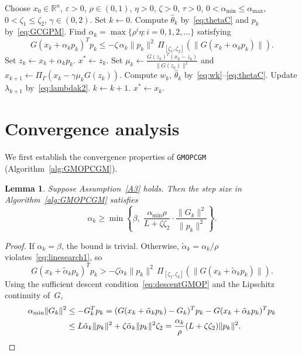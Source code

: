 \documentclass{article}
\theoremstyle{plain}
\newtheorem{lemma}{Lemma}
\theoremstyle{definition}
\theoremstyle{remark}
\newcommand{\R}{\mathbb{R}}
\newcommand{\norm}[1]{\|#1\|}
\newcommand{\PG}{\Pi_{\Gamma}}
\newcommand{\PI}[1]{\Pi_{#1}}
\newcommand{\algoname}[1]{{\small\texttt{#1}}}
\newcommand{\GMOPCGM}{\algoname{GMOPCGM}}
\newcommand{\GCGPM}{\algoname{GCGPM}}
\newcommand{\thetaC}{\hat{\theta}_k}                       %
\begin{document}
\begin{algorithm}[ht]
\caption{Generalized Conjugate Gradient Projection Method (\GCGPM)}
\label{alg:GCGPM}
\begin{algorithmic}[1]
  \State Choose $x_0 \in \R^n$, $\varepsilon > 0$, $\rho \in (0,1)$, $\eta > 0$, $\zeta > 0$, $\tau > 0$,
  \Statex \hspace{1.5em} $0 < \alpha_{\min} \leq \alpha_{\max}$, $0 < \zeta_1 \leq \zeta_2$, $\gamma \in (0,2)$. Set $k \gets 0$.
  \While{$\norm{G_k} > \varepsilon$}
    \State Compute $\thetaC$ by~\eqref{eq:thetaC} and $p_k$ by~\eqref{eq:GCGPM}.
    \State Find $\alpha_k = \max\{\rho^i \eta : i = 0,1,2,\ldots\}$ satisfying
    \begin{equation}\label{eq:linesearch2}
      G(x_k + \alpha_k p_k)^T p_k \leq -\zeta\,\alpha_k\norm{p_k}^2\,\PI{[\zeta_1,\zeta_2]}(\norm{G(x_k + \alpha_k p_k)}).
    \end{equation}
    \State Set $z_k \gets x_k + \alpha_k p_k$.
    \If{$z_k \in \Gamma$ and $\norm{G(z_k)} \leq \varepsilon$}
      \State \Return $x^* \gets z_k$.
    \EndIf
    \State Set $\mu_k \gets \frac{G(z_k)^T(x_k - z_k)}{\norm{G(z_k)}^2}$ and $x_{k+1} \gets \PG(x_k - \gamma\mu_k G(z_k))$.
    \State Compute $w_k$, $\thetaC$ by~\eqref{eq:wk}--\eqref{eq:thetaC}.
    \State Update $\lambda_{k+1}$ by~\eqref{eq:lambdak2}.
    \State $k \gets k+1$.
  \EndWhile
  \State \Return $x^* \gets x_k$.
\end{algorithmic}
\end{algorithm}

\section{Convergence analysis}\label{sec:convergence}

We first establish the convergence properties of \GMOPCGM{} (Algorithm~\ref{alg:GMOPCGM}).

\begin{lemma}\label{lem:stepsizeGMOP}
Suppose Assumption~\ref{A3} holds. Then the step size in Algorithm~\ref{alg:GMOPCGM} satisfies
\[
  \alpha_k \geq \min\!\left\{\beta,\; \frac{\alpha_{\min}\rho}{L + \zeta\zeta_2}\cdot\frac{\norm{G_k}^2}{\norm{p_k}^2}\right\}.
\]
\end{lemma}
\begin{proof}
If $\alpha_k = \beta$, the bound is trivial. Otherwise, $\tilde{\alpha}_k = \alpha_k/\rho$ violates~\eqref{eq:linesearch1}, so
\[
  G(x_k + \tilde{\alpha}_k p_k)^T p_k > -\zeta\tilde{\alpha}_k\norm{p_k}^2\,\PI{[\zeta_1,\zeta_2]}(\norm{G(x_k + \tilde{\alpha}_k p_k)}).
\]
Using the sufficient descent condition~\eqref{eq:descentGMOP} and the Lipschitz continuity of~$G$,
\begin{align*}
  \alpha_{\min}\norm{G_k}^2 &\leq -G_k^T p_k = (G(x_k + \tilde{\alpha}_k p_k) - G_k)^T p_k - G(x_k + \tilde{\alpha}_k p_k)^T p_k \\
  &\leq L\tilde{\alpha}_k\norm{p_k}^2 + \zeta\tilde{\alpha}_k\norm{p_k}^2\zeta_2
  = \frac{\alpha_k}{\rho}(L + \zeta\zeta_2)\norm{p_k}^2. \qedhere
\end{align*}
\end{proof}
\end{document}

